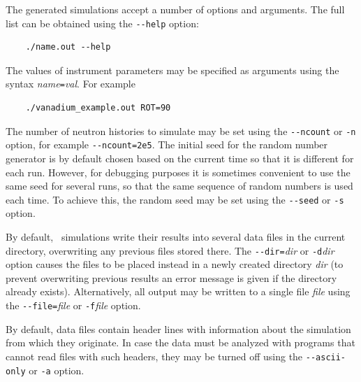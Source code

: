 The generated simulations accept a number of options and arguments. The
full list can be obtained using the \verb+--help+ option:
\begin{verbatim}
    ./name.out --help
\end{verbatim}
The values of instrument parameters may be specified as arguments using
the syntax \textit{name}\verb+=+\textit{val}. For example
\begin{verbatim}
    ./vanadium_example.out ROT=90
\end{verbatim}
The number of neutron histories to simulate may be set using the
\verb+--ncount+ or \verb+-n+ option, for example
\verb+--ncount=2e5+. The initial seed for the random number generator is
by default chosen based on the current time so that it is different for
each run. However, for debugging purposes it is sometimes convenient to
use the same seed for several runs, so that the same sequence of random
numbers is used each time. To achieve this, the random seed may be set
using the \verb+--seed+ or \verb+-s+ option.

By default, \MCS\ simulations write their results into several data
files in the current directory, overwriting any previous files stored
there. The \verb+--dir=+\textit{dir} or \verb+-d+\textit{dir} option
causes the files to be placed instead in a newly created directory
\textit{dir} (to prevent overwriting previous results an error message is given if
the directory already exists). Alternatively, all output may be written
to a single file \textit{file} using the
\verb+--file=+\textit{file} or \verb+-f+\textit{file} option.

By default, data files contain header lines with information about the
simulation from which they originate. In case the data must be analyzed
with programs that cannot read files with such headers, they may be
turned off using the \verb+--ascii-only+ or \verb+-a+ option.

